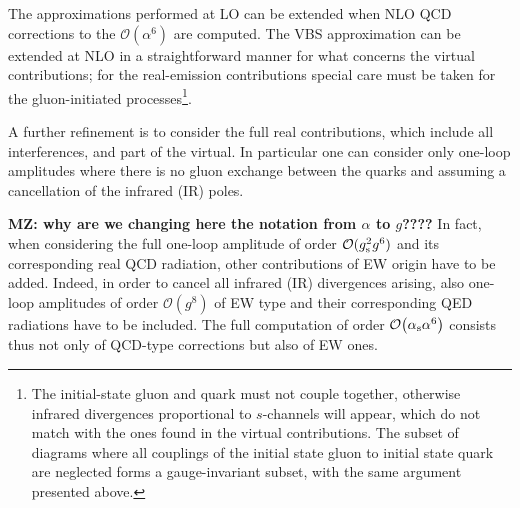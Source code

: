 The approximations performed at LO can be extended when NLO QCD corrections to the $\mathcal{O}{\left(\alpha^{6}\right)}$ are computed.
The VBS approximation can be extended at NLO in a straightforward manner for what concerns the virtual contributions; 
for the real-emission contributions special care must be taken for the gluon-initiated processes\footnote{The initial-state gluon and quark 
    must not couple together, otherwise infrared divergences proportional to $s$-channels will appear, 
     which do not match with the ones found in the virtual contributions.
     The subset of diagrams where all couplings of the initial state gluon to initial state quark are neglected forms a gauge-invariant subset, with the same argument presented above.}.
     \iffalse
This is implemented in the {\sc Powheg-Box}.
This approximation can be used in combination with a double-pole approximation \cite{Dittmaier:2015bfe} for the virtual contribution.
Such an approximation is implemented in {\sc Bonsay}.
In {\sc VBFNLO}, the $s$-channel contributions are available as well and can be
added on top of the VBS approximation. For the real emission diagrams, thereby
as simplification the gluon emission is fully modelled only for initial-state
radiation\AK{I don't understand this sentence. What does 'thereby' refer to?}. The effect of final-state radiation together with the corresponding
virtual contributions is included as a $K$-factor. 
\fi

A further refinement is to consider the full real contributions, which include all interferences, and part of the virtual.
In particular one can consider only one-loop amplitudes where there is no gluon exchange between the quarks and 
assuming a cancellation of the infrared (IR) poles.

{\bf MZ: why are we changing here the notation from $\alpha$ to $g$????}
In fact, when considering the full one-loop amplitude of order $\mathcal{O}(g_{\rm s}^2 g^6)$ and its corresponding real QCD radiation, 
other contributions of EW origin have to be added.
Indeed, in order to cancel all infrared (IR) divergences arising, also one-loop amplitudes of order $\mathcal{O}(g^8)$ of EW type and their corresponding QED radiations have to be included.
The full computation of order $\mathcal{O}{\left(\alpha_\text{s} \alpha^{6}\right)}$ consists thus not only of QCD-type corrections but also of EW ones. 

